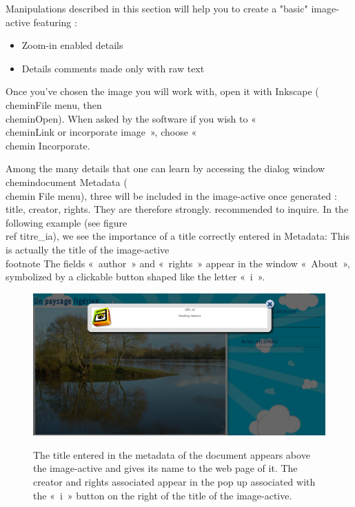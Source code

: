 Manipulations described in this section will help you to
create a "basic" image-active featuring :
\begin{itemize}
 \item Zoom-in enabled details
 \item Details comments made only with raw text
\end{itemize}


Once you've chosen the image you will work with, open it with Inkscape 
(\\chemin{File} menu, then \\chemin{Open}).  When asked by the software
if you wish to «~\\chemin{Link or incorporate image}~», choose «~\\chemin
{Incorporate}.

Among the many details that one can learn by accessing the 
dialog window \\chemin{document} Metadata (\\chemin
{File} menu), three will be included in the image-active once
generated : title, creator, rights. They are therefore strongly.
recommended to inquire. In the following example (see figure \\ref
{titre_ia}), we see the importance of a title correctly entered in
Metadata: This is actually the title of the image-active  \\footnote {The
fields «~author~» and «~rights~» appear in the window
«~About~», symbolized by a clickable button shaped like the letter «~i~»}.

\begin{figure}[htp]
 \centering
 \caption{The title entered in the metadata of the document appears above 
the image-active and gives its name to the web page of it. The creator and 
 rights associated appear in the pop up associated with the «~i~» button 
on the right of the title of the image-active.}
 \includegraphics[width=\textwidth]{images/titre_ia}
 \label{titre_ia}
\end{figure}

